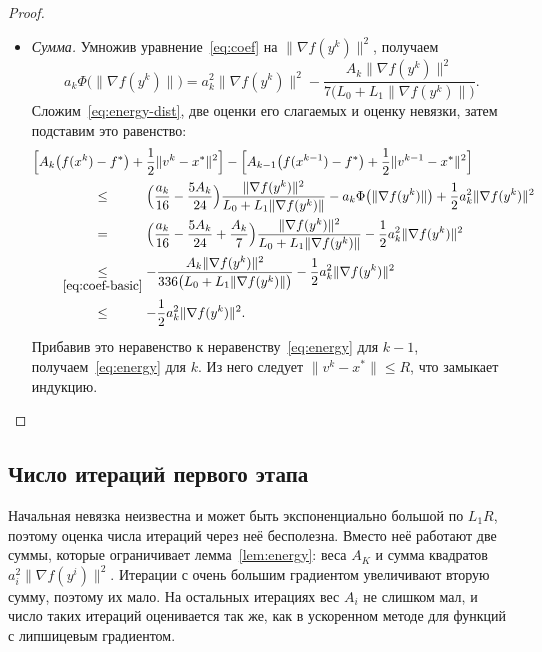 \documentclass[11pt,a4paper]{article}
\newcommand{\norm}[1]{\|#1\|}
\newcommand{\by}[2]{\mathrel{\underset{#2}{#1}}}
\newcommand{\bypad}[3]{\mathrel{\underset{\mathmakebox[\widthof{$\scriptstyle#3$}]{#2}}{#1}}}
\begin{document}
\begin{proof}
\begin{itemize}
\begin{align*}
 &\bypad{=}{}{\eqref{eq:energy-step}}a_k\bigl(f(y^k)-f^\ast\bigr)-\frac{5A_k\norm{\nabla f(y^k)}^2}{24\bigl(L_0+L_1\norm{\nabla f(y^k)}\bigr)} .
\end{align*}
\item \emph{Сумма.} Умножив уравнение~\eqref{eq:coef} на $\norm{\nabla f(y^k)}^2$, получаем
\[
 a_k\Phi\bigl(\norm{\nabla f(y^k)}\bigr)=a_k^2\norm{\nabla f(y^k)}^2-\frac{A_k\norm{\nabla f(y^k)}^2}{7\bigl(L_0+L_1\norm{\nabla f(y^k)}\bigr)} .
\]
Сложим~\eqref{eq:energy-dist}, две оценки его слагаемых и оценку невязки, затем подставим это равенство:
\begin{align*}
 \MoveEqLeft\Bigl[A_k\bigl(f(x^k)-f^\ast\bigr)+\frac12\norm{v^k-x^\ast}^2\Bigr]-\Bigl[A_{k-1}\bigl(f(x^{k-1})-f^\ast\bigr)+\frac12\norm{v^{k-1}-x^\ast}^2\Bigr]\\
 &\bypad{\le}{}{\eqref{eq:coef-basic}}\Bigl(\frac{a_k}{16}-\frac{5A_k}{24}\Bigr)\frac{\norm{\nabla f(y^k)}^2}{L_0+L_1\norm{\nabla f(y^k)}}-a_k\Phi\bigl(\norm{\nabla f(y^k)}\bigr)+\frac12a_k^2\norm{\nabla f(y^k)}^2\\
 &\bypad{=}{}{\eqref{eq:coef-basic}}\Bigl(\frac{a_k}{16}-\frac{5A_k}{24}+\frac{A_k}7\Bigr)\frac{\norm{\nabla f(y^k)}^2}{L_0+L_1\norm{\nabla f(y^k)}}-\frac12a_k^2\norm{\nabla f(y^k)}^2\\
 &\by{\le}{\eqref{eq:coef-basic}}-\frac{A_k\norm{\nabla f(y^k)}^2}{336\bigl(L_0+L_1\norm{\nabla f(y^k)}\bigr)}-\frac12a_k^2\norm{\nabla f(y^k)}^2\\
 &\bypad{\le}{}{\eqref{eq:coef-basic}}-\frac12a_k^2\norm{\nabla f(y^k)}^2 .
\end{align*}
Прибавив это неравенство к неравенству~\eqref{eq:energy} для $k-1$, получаем~\eqref{eq:energy} для $k$. Из него следует $\norm{v^k-x^\ast}\le R$, что замыкает индукцию.\qedhere
\end{itemize}
\end{proof}

\subsection{Число итераций первого этапа}\label{sec:count3}

Начальная невязка неизвестна и может быть экспоненциально большой по $L_1R$, поэтому оценка числа итераций через неё бесполезна. Вместо неё работают две суммы, которые ограничивает лемма~\ref{lem:energy}: веса $A_K$ и сумма квадратов $a_i^2\norm{\nabla f(y^i)}^2$. Итерации с очень большим градиентом увеличивают вторую сумму, поэтому их мало. На остальных итерациях вес $A_i$ не слишком мал, и число таких итераций оценивается так же, как в ускоренном методе для функций с липшицевым градиентом.
\end{document}
